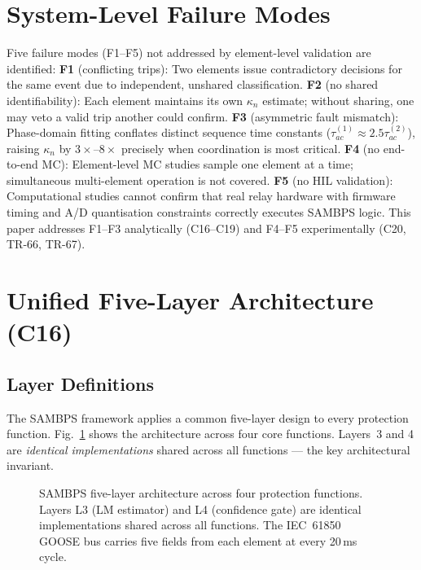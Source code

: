 \documentclass[journal,twoside]{IEEEtran}
\begin{document}
\section{System-Level Failure Modes}
\label{sec:system_failures}

Five failure modes (F1--F5) not addressed by element-level validation are
identified:
\textbf{F1} (conflicting trips): Two elements issue contradictory decisions for
the same event due to independent, unshared classification.
\textbf{F2} (no shared identifiability): Each element maintains its own
$\kappa_n$ estimate; without sharing, one may veto a valid trip another could
confirm.
\textbf{F3} (asymmetric fault mismatch): Phase-domain fitting conflates distinct
sequence time constants ($\tau_{ac}^{(1)} \approx 2.5\tau_{ac}^{(2)}$), raising
$\kappa_n$ by $3\times$--$8\times$ precisely when coordination is most critical.
\textbf{F4} (no end-to-end MC): Element-level MC studies sample one element at
a time; simultaneous multi-element operation is not covered.
\textbf{F5} (no HIL validation): Computational studies cannot confirm that real
relay hardware with firmware timing and A/D quantisation constraints correctly
executes SAMBPS logic.
This paper addresses F1--F3 analytically (C16--C19) and F4--F5 experimentally
(C20, TR-66, TR-67).

\section{Unified Five-Layer Architecture (C16)}
\label{sec:arch}

\subsection{Layer Definitions}

The SAMBPS framework applies a common five-layer design to every protection
function.
Fig.~\ref{fig:5layer} shows the architecture across four core functions.
Layers~3 and 4 are \emph{identical implementations} shared across all
functions --- the key architectural invariant.

\begin{figure}[t]
  \centering
  \resizebox{\columnwidth}{!}{}
  \caption{SAMBPS five-layer architecture across four protection functions.
    Layers L3 (LM estimator) and L4 (confidence gate) are identical
    implementations shared across all functions.  The IEC~61850 GOOSE bus
    carries five fields from each element at every 20\,ms cycle.}
  \label{fig:5layer}
\end{figure}
\end{document}
